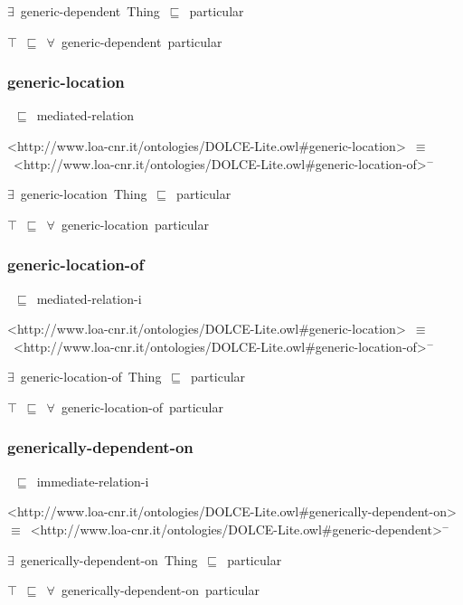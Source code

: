 \documentclass{article}
\begin{document}
\ensuremath{\exists}~generic-dependent~Thing~\ensuremath{\sqsubseteq}~particular

\ensuremath{\top}~\ensuremath{\sqsubseteq}~\ensuremath{\forall}~generic-dependent~particular

\subsubsection*{generic-location}

~\ensuremath{\sqsubseteq}~mediated-relation

<http://www.loa-cnr.it/ontologies/DOLCE-Lite.owl#generic-location>~\ensuremath{\equiv}~<http://www.loa-cnr.it/ontologies/DOLCE-Lite.owl#generic-location-of>\ensuremath{^-}

\ensuremath{\exists}~generic-location~Thing~\ensuremath{\sqsubseteq}~particular

\ensuremath{\top}~\ensuremath{\sqsubseteq}~\ensuremath{\forall}~generic-location~particular

\subsubsection*{generic-location-of}

~\ensuremath{\sqsubseteq}~mediated-relation-i

<http://www.loa-cnr.it/ontologies/DOLCE-Lite.owl#generic-location>~\ensuremath{\equiv}~<http://www.loa-cnr.it/ontologies/DOLCE-Lite.owl#generic-location-of>\ensuremath{^-}

\ensuremath{\exists}~generic-location-of~Thing~\ensuremath{\sqsubseteq}~particular

\ensuremath{\top}~\ensuremath{\sqsubseteq}~\ensuremath{\forall}~generic-location-of~particular

\subsubsection*{generically-dependent-on}

~\ensuremath{\sqsubseteq}~immediate-relation-i

<http://www.loa-cnr.it/ontologies/DOLCE-Lite.owl#generically-dependent-on>~\ensuremath{\equiv}~<http://www.loa-cnr.it/ontologies/DOLCE-Lite.owl#generic-dependent>\ensuremath{^-}

\ensuremath{\exists}~generically-dependent-on~Thing~\ensuremath{\sqsubseteq}~particular

\ensuremath{\top}~\ensuremath{\sqsubseteq}~\ensuremath{\forall}~generically-dependent-on~particular
\end{document}
